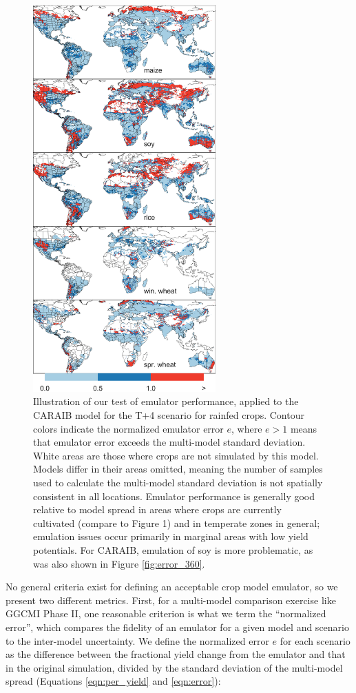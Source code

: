 \documentclass[esd, manuscript]{copernicus} %
\begin{document}
\begin{figure}[ht]
\centering
    \includegraphics[width=7cm]{figures/em_err.png}
    \caption{Illustration of our test of emulator performance, applied to the CARAIB model for the T+4 scenario for rainfed crops. Contour colors indicate the normalized emulator error $e$, where $e > 1$ means that emulator error exceeds the multi-model standard deviation. White areas are those where crops are not simulated by this model. Models differ in their areas omitted, meaning the number of samples used to calculate the multi-model standard deviation is not spatially consistent in all locations. Emulator performance is generally good relative to model spread in areas where crops are currently cultivated (compare to Figure 1) and in temperate zones in general; emulation issues occur primarily in marginal areas with low yield potentials. For CARAIB, emulation of soy is more problematic, as was also shown in Figure \ref{fig:error_360}.}
   \label{fig:error}
\end{figure}

No general criteria exist for defining an acceptable crop model emulator, so we present two different metrics. First, for a multi-model comparison exercise like GGCMI Phase II, one reasonable criterion is what we term the ``normalized error'', which compares the fidelity of an emulator for a given model and scenario to the inter-model uncertainty. We define the normalized error $e$ for each scenario as the difference between the fractional yield change from the emulator and that in the original simulation, divided by the standard deviation of the multi-model spread (Equations \ref{eqn:per_yield} and  \ref{eqn:error}):
\end{document}
